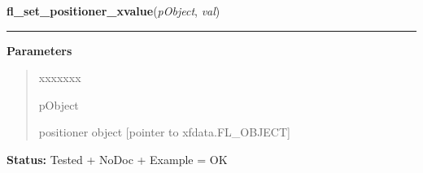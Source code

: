    \label{xformslib:library:fl_set_positioner_xvalue}

    \vspace{0.5ex}

\hspace{.8\funcindent}\begin{boxedminipage}{\funcwidth}

    \raggedright \textbf{fl\_set\_positioner\_xvalue}(\textit{pObject}, \textit{val})

    \vspace{-1.5ex}

    \rule{\textwidth}{0.5\fboxrule}
\setlength{\parskip}{2ex}
\setlength{\parskip}{1ex}
      \textbf{Parameters}
      \vspace{-1ex}

      \begin{quote}
        \begin{Ventry}{xxxxxxx}

          \item[pObject]

          positioner object [pointer to xfdata.FL\_OBJECT]

        \end{Ventry}

      \end{quote}

\textbf{Status:} Tested + NoDoc + Example = OK



    \end{boxedminipage}

    \label{xformslib:library:fl_get_positioner_xvalue}

    \vspace{0.5ex}

